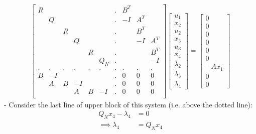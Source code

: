 \newcommand\aug{\fboxsep=-\fboxrule\!\!\!\fbox{\strut}\!\!\!}
\begin{align}
    \begin{bmatrix}
        R   & \     & \     & \     & \     &       & . & B^T &  &  \\
        \   & Q     & \     & \     & \     &       & . & -I & A^T &  \\
        \   & \     & R     & \     & \     &       & . & & B^T & \\
        \   & \     & \     & Q     & \     &       & . & & -I    & A^T \\
        \   & \     & \     & \     & R     &       & . & &   & B^T \\
        \   & \     & \     & \     & \     & Q_N   & . &   &  & -I \\
        .   & .     & .     & .     & .     & . & . &  .    &  .   & . \\
        B   & -I     & \     & \     & \     & \   & . &  0 & 0 & 0 \\
        \   & A     & B     & -I     & \     & \   & . &  0 & 0 & 0 \\
        \   & \     & \     & A     & B     & -I   & . &  0 & 0 & 0 \\
    \end{bmatrix}
    \begin{bmatrix}
        u_1 \\
        x_2 \\
        u_2 \\
        x_3 \\
        u_3 \\
        x_4 \\
        \lambda_2 \\
        \lambda_3 \\
        \lambda_4 
    \end{bmatrix}
    =
    \begin{bmatrix}
        0 \\
        0 \\
        0 \\
        0 \\
        0 \\
        0 \\
        -A x_1 \\
        0 \\
        0
    \end{bmatrix}    
\end{align}
-
\noindent
Consider the last line of upper block of this system (i.e. above the dotted line): 
\begin{align}
Q_N x_4 - \lambda_4 &= 0 \\
\implies \lambda_4 &= Q_N x_4 
\end{align}

